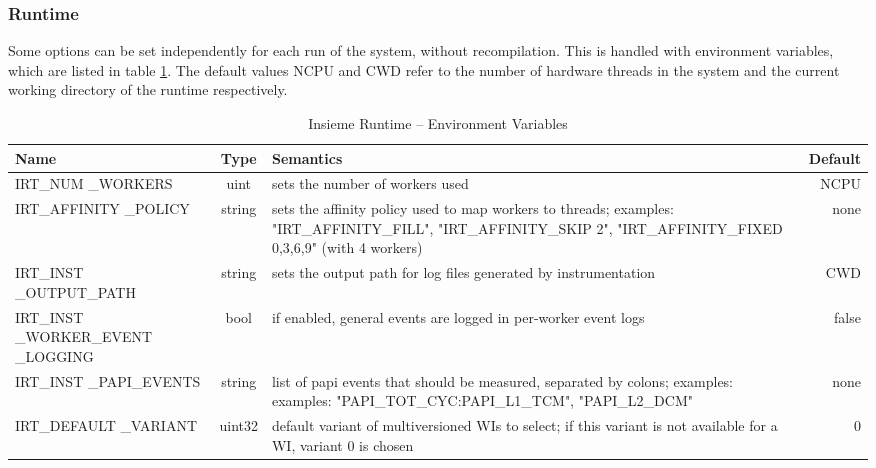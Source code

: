 \subsubsection{Runtime}
Some options can be set independently for each run of the system, without recompilation. This is handled with environment variables, which are listed in table \ref{tab:runtime:options:environment}. The default values NCPU and CWD refer to the number of hardware threads in the system and the current working directory of the runtime respectively.

\begin{table}[htbp] \small
	\centering
    \begin{tabular}{|p{3cm}|c|p{7cm}|r|}
        \hline
        Name                              & Type   & Semantics                                                                                                       & Default       \\ \hline \hline
        IRT\_NUM \_WORKERS                 & uint   & sets the number of workers used                                                                                 & NCPU                \\ \hline
        IRT\_AFFINITY \_POLICY             & string & sets the affinity policy used to map workers to threads; examples: "IRT\_AFFINITY\_FILL", "IRT\_AFFINITY\_SKIP 2", "IRT\_AFFINITY\_FIXED 0,3,6,9" (with 4 workers)                                                         & none \\ \hline
        IRT\_INST \_OUTPUT\_PATH           & string & sets the output path for log files generated by instrumentation                                                 & CWD                 \\ \hline
        IRT\_INST \_WORKER\_EVENT \_LOGGING & bool   & if enabled, general events are logged in per-worker event logs                                                  & false               \\ \hline
        IRT\_INST \_PAPI\_EVENTS           & string & list of papi events that should be measured, separated by colons; examples: examples: "PAPI\_TOT\_CYC:PAPI\_L1\_TCM", "PAPI\_L2\_DCM"                                                & none                \\ \hline
        IRT\_DEFAULT \_VARIANT               & uint32 & default variant of multiversioned WIs to select; if this variant is not available for a WI, variant 0 is chosen & 0                   \\ \hline
    \end{tabular}
	\caption{Insieme Runtime -- Environment Variables}
	\label{tab:runtime:options:environment}
\end{table} 


